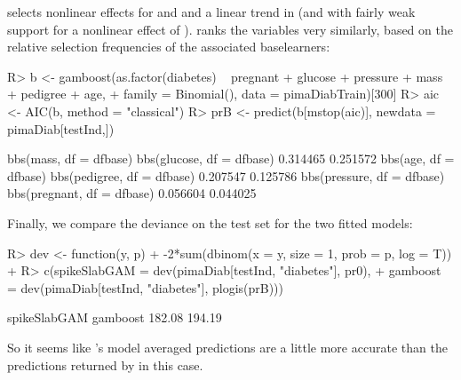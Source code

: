 \documentclass[article, shortnames, nojss, noheadings, notitle]{jss}
\begin{document}
 selects nonlinear effects for  and  and a linear trend in 
(and with fairly weak support for a nonlinear effect of ).
 ranks the variables very similarly, based on the relative selection frequencies of the associated baselearners:
\begin{Schunk}
\begin{Sinput}
R> b <- gamboost(as.factor(diabetes) ~ pregnant + glucose + pressure + mass + pedigree + age,
+          family = Binomial(), data = pimaDiabTrain)[300]
R> aic <- AIC(b, method = "classical")
R> prB <- predict(b[mstop(aic)], newdata = pimaDiab[testInd,])
\end{Sinput}
\end{Schunk}
\begin{Schunk}
\begin{Soutput}
    bbs(mass, df = dfbase)  bbs(glucose, df = dfbase) 
                  0.314465                   0.251572 
     bbs(age, df = dfbase) bbs(pedigree, df = dfbase) 
                  0.207547                   0.125786 
bbs(pressure, df = dfbase) bbs(pregnant, df = dfbase) 
                  0.056604                   0.044025 
\end{Soutput}
\end{Schunk}
Finally, we compare the deviance on the test set for the two fitted models:
\begin{Schunk}
\begin{Sinput}
R> dev <- function(y, p){
+      -2*sum(dbinom(x = y, size = 1, prob = p, log = T))
+  }
R> c(spikeSlabGAM = dev(pimaDiab[testInd, "diabetes"], pr0),
+      gamboost   = dev(pimaDiab[testInd, "diabetes"], plogis(prB)))
\end{Sinput}
\begin{Soutput}
spikeSlabGAM     gamboost 
      182.08       194.19 
\end{Soutput}
\end{Schunk}
So it seems like 's model averaged predictions are a little more accurate
than the predictions returned by  in this case.
\end{document}
